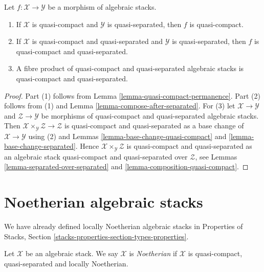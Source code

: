 \begin{lemma}
\label{lemma-quasi-compact-quasi-separated-permanence}
Let $f : \mathcal{X} \to \mathcal{Y}$ be a morphism of algebraic stacks.
\begin{enumerate}
\item If $\mathcal{X}$ is quasi-compact and $\mathcal{Y}$ is
quasi-separated, then $f$ is quasi-compact.
\item If $\mathcal{X}$ is quasi-compact and quasi-separated and $\mathcal{Y}$
is quasi-separated, then $f$ is quasi-compact and quasi-separated.
\item A fibre product of quasi-compact and quasi-separated algebraic stacks
is quasi-compact and quasi-separated.
\end{enumerate}
\end{lemma}

\begin{proof}
Part (1) follows from
Lemma \ref{lemma-quasi-compact-permanence}.
Part (2) follows from (1) and
Lemma \ref{lemma-compose-after-separated}.
For (3) let $\mathcal{X} \to \mathcal{Y}$ and $\mathcal{Z} \to \mathcal{Y}$
be morphisms of quasi-compact and quasi-separated algebraic stacks.
Then $\mathcal{X} \times_\mathcal{Y} \mathcal{Z} \to \mathcal{Z}$
is quasi-compact and quasi-separated as a base change of
$\mathcal{X} \to \mathcal{Y}$ using (2) and
Lemmas \ref{lemma-base-change-quasi-compact} and
\ref{lemma-base-change-separated}.
Hence $\mathcal{X} \times_\mathcal{Y} \mathcal{Z}$
is quasi-compact and quasi-separated as
an algebraic stack quasi-compact and quasi-separated over
$\mathcal{Z}$, see
Lemmas \ref{lemma-separated-over-separated} and
\ref{lemma-composition-quasi-compact}.
\end{proof}








\section{Noetherian algebraic stacks}
\label{section-noetherian}

\noindent
We have already defined locally Noetherian algebraic stacks in
Properties of Stacks, Section \ref{stacks-properties-section-types-properties}.

\begin{definition}
\label{definition-noetherian}
Let $\mathcal{X}$ be an algebraic stack. We say $\mathcal{X}$ is
{\it Noetherian} if $\mathcal{X}$ is quasi-compact, quasi-separated
and locally Noetherian.
\end{definition}

